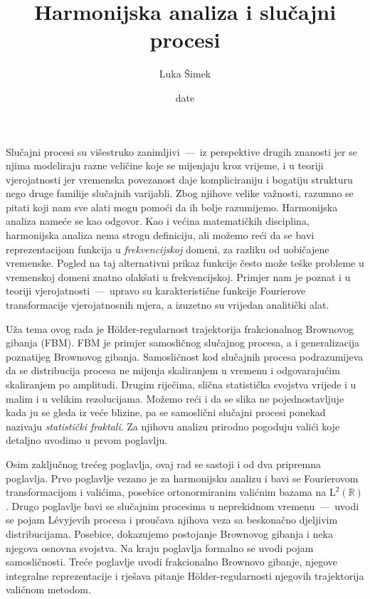 \documentclass[a4paper,twoside,12pt]{memoir}
\title{Harmonijska analiza i slu\v{c}ajni procesi}
\author{Luka Šimek}
\date{date}
\numberwithin{teorem}{section}
\numberwithin{equation}{chapter}
\numberwithin{figure}{chapter}
\numberwithin{table}{chapter}
\newcommand{\R}{\mathbb{R}}
\newcommand{\holder}{H\" older}
\newcommand{\levy}{L\' evy}
\def\L{\mathrm{L}}
\begin{document}
\frontmatter

\begin{intro}
	Slučajni procesi su višestruko zanimljivi~---~iz perspektive drugih znanosti jer
	se njima modeliraju razne veličine koje se mijenjaju kroz vrijeme, i u teoriji vjerojatnosti
	jer vremenska povezanost daje kompliciraniju i bogatiju strukturu nego druge familije slučajnih varijabli.
	Zbog njihove velike važnosti, razumno se pitati koji nam
	sve alati mogu pomoći da ih bolje razumijemo. Harmonijska analiza nameće se kao odgovor.
	Kao i većina matematičkih disciplina, harmonijska analiza nema strogu definiciju, ali
	možemo reći da se bavi reprezentacijom funkcija u \emph{frekvencijskoj} domeni, za razliku
	od uobičajene vremenske. Pogled na taj alternativni prikaz funkcije često može teške
	probleme u vremenskoj domeni znatno olakšati u frekvencijskoj. Primjer nam
	je poznat i u teoriji vjerojatnosti~---~upravo su karakteristične funkcije Fourierove transformacije
	vjerojatnosnih mjera, a izuzetno su vrijedan analitički alat.

	Uža tema ovog rada je \holder -regularnost trajektorija frakcionalnog Brownovog gibanja (FBM).
	FBM je primjer samosličnog slučajnog procesa, a i generalizacija poznatijeg Brownovog gibanja. Samosličnost kod slučajnih procesa
	podrazumijeva da se distribucija procesa ne mijenja skaliranjem u vremenu i odgovarajućim skaliranjem po amplitudi. Drugim riječima, slična statistička svojstva
	vrijede i u malim i u velikim rezolucijama.
	Možemo reći i da se slika ne pojednostavljuje kada ju se gleda iz veće blizine, pa se
	samoslični slučajni procesi ponekad nazivaju \emph{statistički fraktali}.
	Za njihovu analizu prirodno pogoduju valići koje detaljno uvodimo u prvom poglavlju.%

	Osim zaključnog trećeg poglavlja, ovaj rad se sastoji i od dva pripremna poglavlja.
	Prvo poglavlje vezano je za harmonijsku analizu i bavi se Fourierovom transformacijom
	i valićima, posebice ortonormiranim valićnim bazama na \( \L^2(\R) \).
	Drugo poglavlje bavi se slučajnim procesima u neprekidnom vremenu~---~uvodi se pojam \levy jevih
	procesa i proučava njihova veza sa beskonačno djeljivim distribucijama. Posebice, dokazujemo
	postojanje Brownovog gibanja i neka njegova osnovna svojstva. Na kraju poglavlja formalno se uvodi pojam samosličnosti.
	Treće poglavlje uvodi frakcionalno Brownovo gibanje, njegove integralne reprezentacije i
	rješava pitanje \holder -regularnosti njegovih trajektorija valićnom metodom.


\end{intro}
\end{document}
